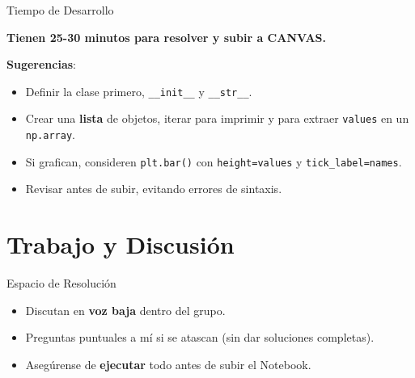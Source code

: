 \documentclass[10pt]{beamer}
\begin{document}
\begin{frame}{Tiempo de Desarrollo}
  \begin{block}{}
    \huge{\textbf{Tienen 25-30 minutos para resolver y subir a CANVAS.}}
  \end{block}
  \vspace{0.3cm}
  \textbf{Sugerencias}:
  \begin{itemize}
    \item Definir la clase primero, \texttt{__init__} y \texttt{__str__}.
    \item Crear una \textbf{lista} de objetos, iterar para imprimir y para extraer \texttt{values} en un \texttt{np.array}.
    \item Si grafican, consideren \texttt{plt.bar()} con \texttt{height=values} y \texttt{tick\_label=names}.
    \item Revisar antes de subir, evitando errores de sintaxis.
  \end{itemize}
\end{frame}

\section{Trabajo y Discusión}

\begin{frame}{Espacio de Resolución}
  \begin{itemize}
    \item Discutan en \textbf{voz baja} dentro del grupo.
    \item Preguntas puntuales a mí si se atascan (sin dar soluciones completas).
    \item Asegúrense de \textbf{ejecutar} todo antes de subir el Notebook.
  \end{itemize}
\end{frame}
\end{document}
